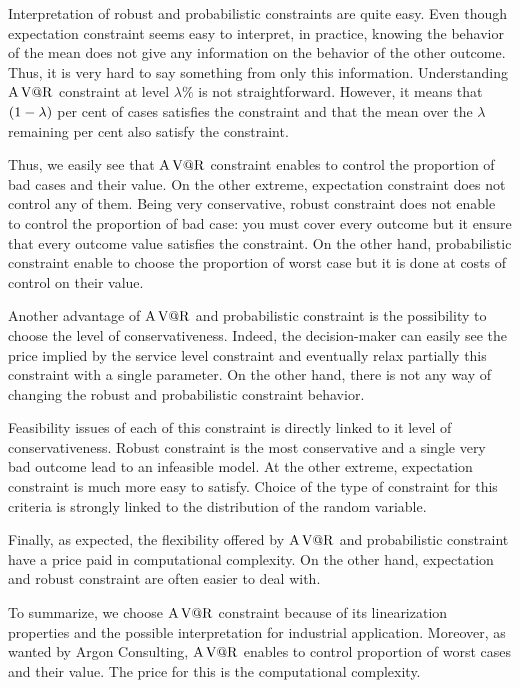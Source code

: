 Interpretation of robust and probabilistic constraints are quite easy.
Even though expectation constraint seems easy to interpret, in practice, knowing the behavior of the mean does not give any information on the behavior of the other outcome.
Thus, it is very hard to say something from only this information.
Understanding $\operatorname{A\operatorname{V@R}}$ constraint at level $\lambda\%$ is not straightforward.
However, it means that $\bracket{1-\lambda}$ per cent of cases satisfies the constraint and that the mean over the $\lambda$ remaining per cent also satisfy the constraint.


Thus, we easily see that $\operatorname{A\operatorname{V@R}}$ constraint enables to control the proportion of bad cases and their value.
On the other extreme, expectation constraint does not control any of them.
Being very conservative, robust constraint does not enable to control the proportion of bad case: you must cover every outcome but it ensure that every outcome value satisfies the constraint.
On the other hand, probabilistic constraint enable to choose the proportion of worst case but it is done at costs of control on their value.


Another advantage of $\operatorname{A\operatorname{V@R}}$ and probabilistic constraint is the possibility to choose the level of conservativeness.
Indeed, the decision-maker can easily see the price implied by the service level constraint and eventually relax partially this constraint with a single parameter.
On the other hand, there is not any way of changing the robust and probabilistic constraint behavior.


Feasibility issues of each of this constraint is directly linked to it level of conservativeness.
Robust constraint is the most conservative and a single very bad outcome lead to an infeasible model.
At the other extreme, expectation constraint is much more easy to satisfy.
Choice of the type of constraint for this criteria is strongly linked to the distribution of the random variable.


Finally, as expected, the flexibility offered by $\operatorname{A\operatorname{V@R}}$ and probabilistic constraint have a price paid in computational complexity.
On the other hand, expectation and robust constraint are often easier to deal with.


\medskip


To summarize, we choose $\operatorname{A\operatorname{V@R}}$ constraint because of its linearization properties and the possible interpretation for industrial application.
Moreover, as wanted by Argon Consulting, $\operatorname{A\operatorname{V@R}}$ enables to control proportion of worst cases and their value.
The price for this is the computational complexity.


